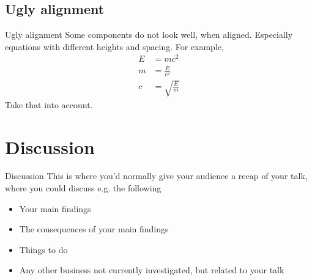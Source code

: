 \documentclass[aspectratio=169]{beamer}
\begin{document}
\subsection{Ugly alignment}
\begin{frame}{Ugly alignment}
  Some components do not look well, when aligned. Especially equations with different
  heights and spacing. For example,
  \begin{align}
     E &= mc^2 \\
     m &= \frac{E}{c^2} \\
     c &= \sqrt{\frac{E}{m}}
  \end{align}
  Take that into account.
\end{frame}

\section{Discussion}
\begin{frame}{Discussion}
  This is where you’d normally give your audience a recap of your talk, where you could
  discuss e.g. the following
  \begin{itemize}
      \item Your main findings
      \item The consequences of your main findings
      \item Things to do
      \item Any other business not currently investigated, but related to your talk
  \end{itemize}
\end{frame}
\end{document}
